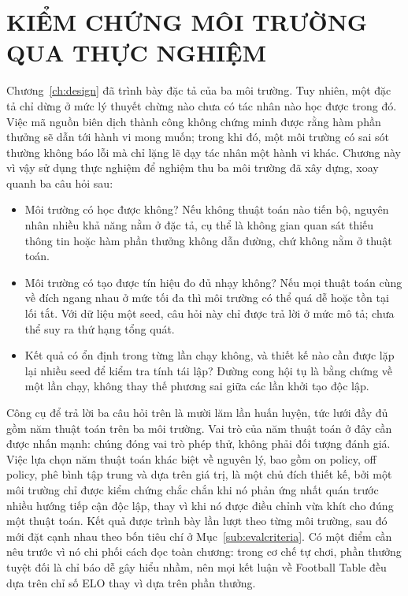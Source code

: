 \fontsize{13pt}{22.5pt}\selectfont

\clearpage
\section{KIỂM CHỨNG MÔI TRƯỜNG QUA THỰC NGHIỆM}
\label{ch:results}

\indent Chương~\ref{ch:design} đã trình bày đặc tả của ba môi trường. Tuy nhiên, một đặc
tả chỉ dừng ở mức lý thuyết chừng nào chưa có tác nhân nào học được trong đó. Việc mã
nguồn biên dịch thành công không chứng minh được rằng hàm phần thưởng sẽ dẫn tới hành vi
mong muốn; trong khi đó, một môi trường có sai sót thường không báo lỗi mà chỉ lặng lẽ dạy
tác nhân một hành vi khác. Chương này vì vậy sử dụng thực nghiệm để nghiệm thu ba môi
trường đã xây dựng, xoay quanh ba câu hỏi sau:

\begin{itemize}
    \item Môi trường có học được không? Nếu không thuật toán nào tiến bộ, nguyên
    nhân nhiều khả năng nằm ở đặc tả, cụ thể là không gian quan sát thiếu thông tin hoặc
    hàm phần thưởng không dẫn đường, chứ không nằm ở thuật toán.
    \item Môi trường có tạo được tín hiệu đo đủ nhạy không? Nếu mọi thuật toán cùng về
    đích ngang nhau ở mức tối đa thì môi trường có thể quá dễ hoặc tồn tại lối tắt. Với dữ
    liệu một seed, câu hỏi này chỉ được trả lời ở mức mô tả; chưa thể suy ra thứ hạng tổng quát.
    \item Kết quả có ổn định trong từng lần chạy không, và thiết kế nào cần được lặp lại
    nhiều seed để kiểm tra tính tái lập? Đường cong hội tụ là bằng chứng về một lần chạy,
    không thay thế phương sai giữa các lần khởi tạo độc lập.
\end{itemize}

\indent Công cụ để trả lời ba câu hỏi trên là mười lăm lần huấn luyện, tức lưới đầy đủ gồm
năm thuật toán trên ba môi trường. Vai trò của năm thuật toán ở đây cần được nhấn mạnh:
chúng đóng vai trò phép thử, không phải đối tượng đánh giá. Việc lựa
chọn năm thuật toán khác biệt về nguyên lý, bao gồm on policy, off policy, phê bình tập
trung và dựa trên giá trị, là một chủ đích thiết kế, bởi một môi trường chỉ được kiểm
chứng chắc chắn khi nó phản ứng nhất quán trước nhiều hướng tiếp cận độc lập, thay vì khi
nó được điều chỉnh vừa khít cho đúng một thuật toán. Kết quả được trình bày lần lượt theo
từng môi trường, sau đó mới đặt cạnh nhau theo bốn tiêu chí ở
Mục~\ref{sub:evalcriteria}. Có một điểm cần nêu trước vì nó chi phối cách đọc toàn chương:
trong cơ chế tự chơi, phần thưởng tuyệt đối là chỉ báo dễ gây hiểu nhầm, nên mọi kết luận
về Football Table đều dựa trên chỉ số ELO thay vì dựa trên phần thưởng.

